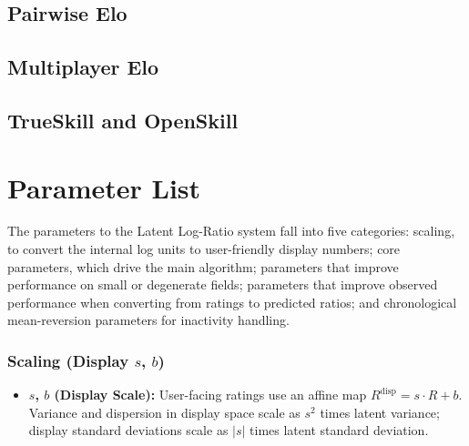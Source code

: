 \documentclass[12pt]{article}
\begin{document}
	\subsection{Pairwise Elo}

	\subsection{Multiplayer Elo}

	\subsection{TrueSkill and OpenSkill}

	\appendix
	\section{Parameter List}
	\label{app:parameters}

		The parameters to the Latent Log-Ratio system fall into five categories: scaling, to convert the internal log units to user-friendly display numbers; core parameters, which drive the main algorithm; parameters that improve performance on small or degenerate fields; parameters that improve observed performance when converting from ratings to predicted ratios; and chronological mean-reversion parameters for inactivity handling.

	\subsubsection*{Scaling (Display $s$, $b$)}
	\begin{itemize}
		\item \textbf{$s$, $b$ (Display Scale):} User-facing ratings use an affine map $R^{\mathrm{disp}} = s\cdot R + b$. Variance and dispersion in display space scale as $s^2$ times latent variance; display standard deviations scale as $|s|$ times latent standard deviation.
	\end{itemize}
\end{document}
